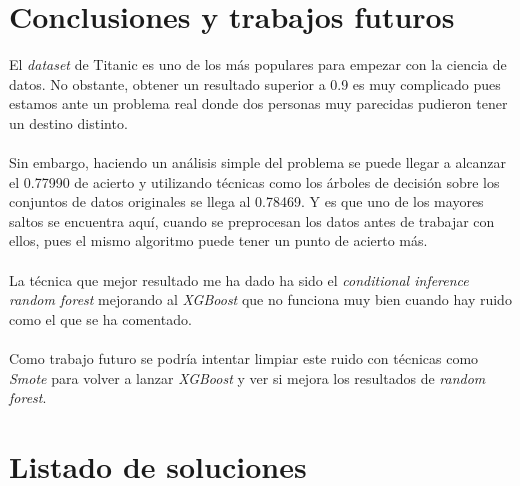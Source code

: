 \section{Conclusiones y trabajos futuros}

El \textit{dataset} de Titanic es uno de los más populares para empezar con la ciencia de datos. No obstante, obtener un resultado superior a 0.9 es muy complicado pues estamos ante un problema real donde dos personas muy parecidas pudieron tener un destino distinto.
\\ \\
Sin embargo, haciendo un análisis simple del problema se puede llegar a alcanzar el 0.77990 de acierto y utilizando técnicas como los árboles de decisión sobre los conjuntos de datos originales se llega al 0.78469. Y es que uno de los mayores saltos se encuentra aquí, cuando se preprocesan los datos antes de trabajar con ellos, pues el mismo algoritmo puede tener un punto de acierto más.
\\ \\
La técnica que mejor resultado me ha dado ha sido el \textit{conditional inference random forest} mejorando al \textit{XGBoost} que no funciona muy bien cuando hay ruido como el que se ha comentado.
\\ \\
Como trabajo futuro se podría intentar limpiar este ruido con técnicas como \textit{Smote} para volver a lanzar \textit{XGBoost} y ver si mejora los resultados de \textit{random forest}.

\section{Listado de soluciones}

